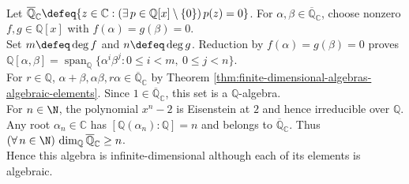 \begin{example} \label{ex:algebraic-infinite-dimensional-algebra} \\
Let $\overline{\mathbb{Q}}_{\mathbb{C}}\defeq\{z\in\mathbb{C}:(\exists\,p\in\mathbb{Q}[x]\setminus\{0\})\,p(z)=0\}$. For $\alpha,\beta\in\overline{\mathbb{Q}}_{\mathbb{C}}$, choose nonzero $f,g\in\mathbb{Q}[x]$ with $f(\alpha)=g(\beta)=0$.\\
Set $m\defeq\deg f$ and $n\defeq\deg g$. Reduction by $f(\alpha)=g(\beta)=0$ proves $\mathbb{Q}[\alpha,\beta]=\operatorname{span}_{\mathbb{Q}}\{\alpha^i\beta^j:0\leq i<m,\ 0\leq j<n\}$.\\
For $r\in\mathbb{Q}$, $\alpha+\beta,\alpha\beta,r\alpha\in\overline{\mathbb{Q}}_{\mathbb{C}}$ by Theorem \ref{thm:finite-dimensional-algebras-algebraic-elements}. Since $1\in\overline{\mathbb{Q}}_{\mathbb{C}}$, this set is a $\mathbb{Q}$-algebra.\\
For $n\in\N$, the polynomial $x^n-2$ is Eisenstein at $2$ and hence irreducible over $\mathbb{Q}$.\\
Any root $\alpha_n\in\mathbb{C}$ has $[\mathbb{Q}(\alpha_n):\mathbb{Q}]=n$ and belongs to $\overline{\mathbb{Q}}_{\mathbb{C}}$. Thus $(\forall\,n\in\N)\,\dim_{\mathbb{Q}}\overline{\mathbb{Q}}_{\mathbb{C}}\geq n$.\\
Hence this algebra is infinite-dimensional although each of its elements is algebraic.
\end{example}

